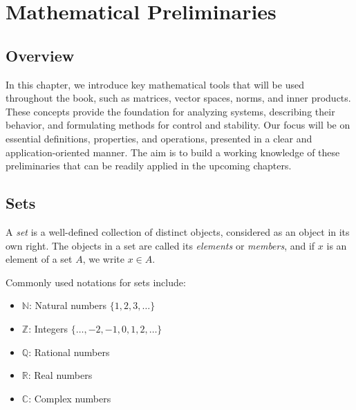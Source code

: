 \chapterspaceabove{6.75cm} %
\chapterspacebelow{7.25cm} %

\chapter{Mathematical Preliminaries}
\section{Overview}
In this chapter, we introduce key mathematical tools that will be used throughout the book, such as matrices, vector spaces, norms, and inner products. These concepts provide the foundation for analyzing systems, describing their behavior, and formulating methods for control and stability. Our focus will be on essential definitions, properties, and operations, presented in a clear and application-oriented manner. The aim is to build a working knowledge of these preliminaries that can be readily applied in the upcoming chapters.


\section{Sets}

\begin{definition}[Set]
A \emph{set} is a well-defined collection of distinct objects, considered as an object in its own right. The objects in a set are called its \emph{elements} or \emph{members}, and if $x$ is an element of a set $A$, we write $x \in A$. 
\end{definition}

\begin{notation}
Commonly used notations for sets include:
\begin{itemize}
    \item $\mathbb{N}$: Natural numbers $\{1,2,3,\dots\}$
    \item $\mathbb{Z}$: Integers $\{\dots,-2,-1,0,1,2,\dots\}$
    \item $\mathbb{Q}$: Rational numbers
    \item $\mathbb{R}$: Real numbers
    \item $\mathbb{C}$: Complex numbers
\end{itemize}
\end{notation}


